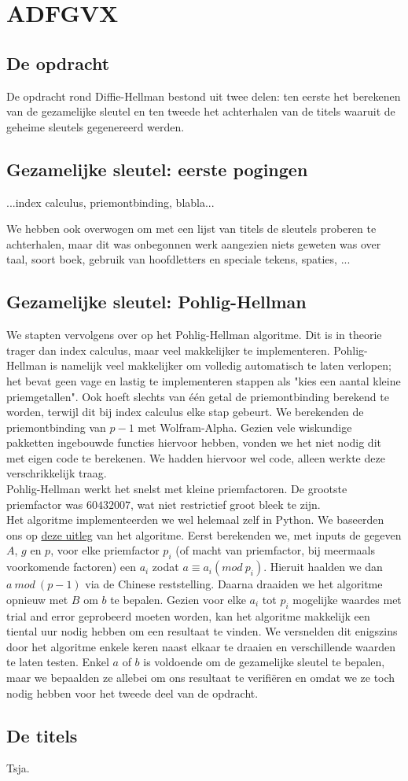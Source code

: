\section{ADFGVX}
\subsection{De opdracht}
De opdracht rond Diffie-Hellman bestond uit twee delen: ten eerste het berekenen van de gezamelijke sleutel en ten tweede het achterhalen van de titels waaruit de geheime sleutels gegenereerd werden.

\subsection{Gezamelijke sleutel: eerste pogingen}
...index calculus, priemontbinding, blabla...

We hebben ook overwogen om met een lijst van titels de sleutels proberen te achterhalen, maar dit was onbegonnen werk aangezien niets geweten was over taal, soort boek, gebruik van hoofdletters en speciale tekens, spaties, ...

\subsection{Gezamelijke sleutel: Pohlig-Hellman}
We stapten vervolgens over op het Pohlig-Hellman algoritme. Dit is in theorie trager dan index calculus, maar veel makkelijker te implementeren. Pohlig-Hellman is namelijk veel makkelijker om volledig automatisch te laten verlopen; het bevat geen vage en lastig te implementeren stappen als "kies een aantal kleine priemgetallen". Ook hoeft slechts van \'e\'en getal de priemontbinding berekend te worden, terwijl dit bij index calculus elke stap gebeurt. We berekenden de priemontbinding van $p-1$ met Wolfram-Alpha. Gezien vele wiskundige pakketten ingebouwde functies hiervoor hebben, vonden we het niet nodig dit met eigen code te berekenen. We hadden hiervoor wel code, alleen werkte deze verschrikkelijk traag.  \\Pohlig-Hellman werkt het snelst met kleine priemfactoren. De grootste priemfactor was $60432007$, wat niet restrictief groot bleek te zijn.  \\ Het algoritme implementeerden we wel helemaal zelf in Python. We baseerden ons op \href{https://www.youtube.com/watch?v=BXFNYVmdtJU}{deze uitleg} van het algoritme. Eerst berekenden we, met inputs de gegeven $A$, $g$ en $p$, voor elke priemfactor $p_i$ (of macht van priemfactor, bij meermaals voorkomende factoren) een $a_i$ zodat $a \equiv a_i (mod\ p_i)$. Hieruit haalden we dan $a\ mod \ (p-1)$ via de Chinese reststelling. Daarna draaiden we het algoritme opnieuw met $B$ om $b$ te bepalen. Gezien voor elke $a_i$ tot $p_i$ mogelijke waardes met trial and error geprobeerd moeten worden, kan het algoritme makkelijk een tiental uur nodig hebben om een resultaat te vinden. We versnelden dit enigszins door het algoritme enkele keren naast elkaar te draaien en verschillende waarden te laten testen. Enkel $a$ of $b$ is voldoende om de gezamelijke sleutel te bepalen, maar we bepaalden ze allebei om ons resultaat te verifi\"eren en omdat we ze toch nodig hebben voor het tweede deel van de opdracht.

\subsection{De titels}
Tsja.
